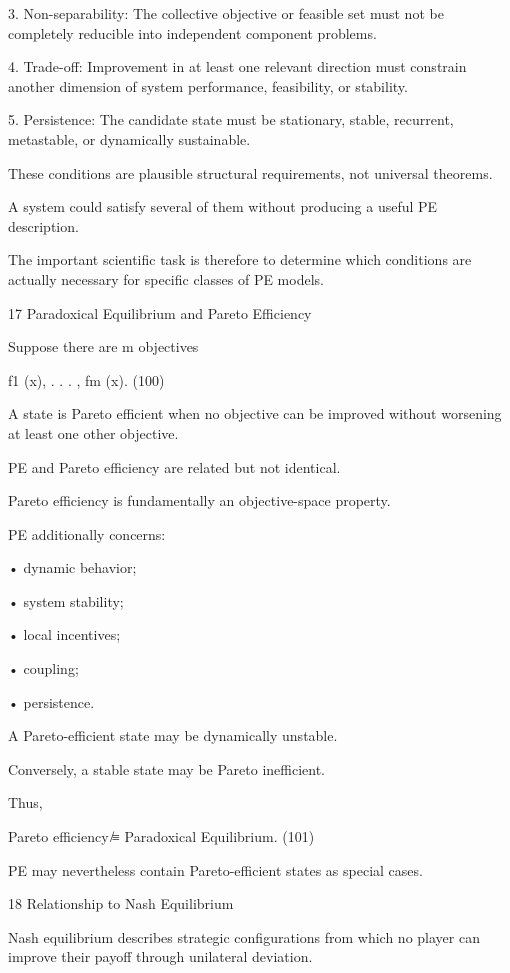 \documentclass[10pt,a4paper]{article}
\begin{document}
\begin{ManuscriptText}
     3. Non-separability: The collective objective or feasible set must not be completely reducible
       into independent component problems.

     4. Trade-off: Improvement in at least one relevant direction must constrain another dimension
       of system performance, feasibility, or stability.


  5. Persistence: The candidate state must be stationary, stable, recurrent, metastable, or
        dynamically sustainable.


These conditions are plausible structural requirements, not universal theorems.

A system could satisfy several of them without producing a useful PE description.

The important scientific task is therefore to determine which conditions are actually necessary
for specific classes of PE models.


17       Paradoxical Equilibrium and Pareto Efficiency

Suppose there are m objectives


                                       f1 (x), . . . , fm (x).                           (100)

A state is Pareto efficient when no objective can be improved without worsening at least one
other objective.

PE and Pareto efficiency are related but not identical.

Pareto efficiency is fundamentally an objective-space property.

PE additionally concerns:


  • dynamic behavior;

  • system stability;

  • local incentives;

  • coupling;

  • persistence.


A Pareto-efficient state may be dynamically unstable.

Conversely, a stable state may be Pareto inefficient.

Thus,


                          Pareto efficiency ̸≡ Paradoxical Equilibrium.                  (101)

PE may nevertheless contain Pareto-efficient states as special cases.


18     Relationship to Nash Equilibrium

Nash equilibrium describes strategic configurations from which no player can improve their
payoff through unilateral deviation.


\end{ManuscriptText}
\end{document}
